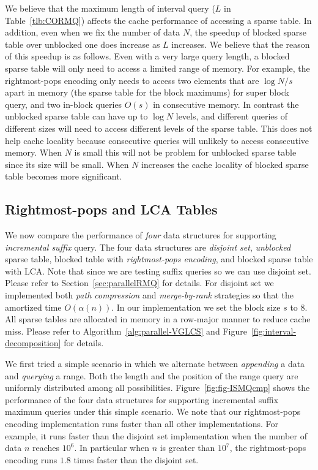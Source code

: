We believe that the maximum length of interval query ($L$ in
Table~\ref{tlb:CORMQ}) affects the cache performance of accessing a
sparse table.  In addition, even when we fix the number of data $N$, the
speedup of blocked sparse table over unblocked one does increase as $L$
increases.  We believe that the reason of this speedup is as follows.
Even with a very large query length, a blocked sparse table will only
need to access a limited range of memory.  For example, the
rightmost-pops encoding only needs to access two elements that are $\log
{N/s}$ apart in memory (the sparse table for the block maximums) for
super block query, and two in-block queries $O(s)$ in consecutive
memory.  In contrast the unblocked sparse table can have up to $\log N$
levels, and different queries of different sizes will need to access
different levels of the sparse table.  This does not help cache locality
because consecutive queries will unlikely to access consecutive memory.
When $N$ is small this will not be problem for unblocked sparse table
since its size will be small.  When $N$ increases the cache locality of
blocked sparse table becomes more significant.




\subsection{Rightmost-pops and LCA Tables}

We now compare the performance of {\em four} data structures for
supporting {\em incremental suffix} query.  The four data structures are
{\em disjoint set}, {\em unblocked} sparse table, blocked table with
{\em rightmost-pops encoding}, and blocked sparse table with LCA. Note
that since we are testing suffix queries so we can use disjoint set.
Please refer to Section~\ref{sec:parallelRMQ} for details. For disjoint
set we implemented both {\em path compression} and {\em merge-by-rank}
strategies so that the amortized time $O(\alpha(n))$. In our
implementation we set the block size $s$ to $8$.  All sparse tables are
allocated in memory in a row-major manner to reduce cache miss.  Please
refer to Algorithm~\ref{alg:parallel-VGLCS} and
Figure~\ref{fig:interval-decomposition} for details.


We first tried a simple scenario in which we alternate between {\em
  appending} a data and {\em querying} a range.  Both the length and
the position of the range query are uniformly distributed among all
possibilities.  Figure~\ref{fig:fig-ISMQcmp} shows the performance of
the four data structures for supporting incremental suffix maximum
queries under this simple scenario.  We note that our rightmost-pops
encoding implementation runs faster than all other implementations.
For example, it runs faster than the disjoint set implementation when
the number of data $n$ reaches $10^6$.  In particular when $n$ is
greater than $10^7$, the rightmost-pops encoding runs $1.8$ times
faster than the disjoint set.



